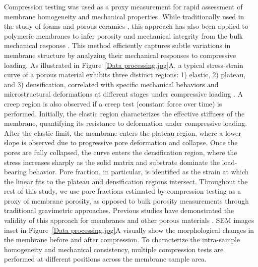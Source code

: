 \documentclass[preprint,12pt,times]{elsarticle}
\begin{document}
Compression testing was used as a proxy measurement for rapid assessment of membrane homogeneity and mechanical properties. While traditionally used in the study of foams and porous ceramics \cite{Thiyagarajan2022, Chen2017}, this approach has also been applied to polymeric membranes to infer porosity and mechanical integrity from the bulk mechanical response \cite{AGHAJANI2017293, Aghajani2018, Gibson_2003}. This method efficiently captures subtle variations in membrane structure by analyzing their mechanical responses to compressive loading. As illustrated in Figure~\ref{Data processing.jpg}A, a typical stress-strain curve of a porous material exhibits three distinct regions: 1) elastic, 2) plateau, and 3) densification, correlated with specific mechanical behaviors and microstructural deformations at different stages under compressive loading \cite{Costa2008, Thiyagarajan2022, AGHAJANI2017293, Gibson_2003}. A creep region is also observed if a creep test (constant force over time) is performed. Initially, the elastic region characterizes the effective stiffness of the membrane, quantifying its resistance to deformation under compressive loading. After the elastic limit, the membrane enters the plateau region, where a lower slope is observed due to progressive pore deformation and collapse. Once the pores are fully collapsed, the curve enters the densification region, where the stress increases sharply as the solid matrix and substrate dominate the load-bearing behavior. Pore fraction, in particular, is identified as the strain at which the linear fits to the plateau and densification regions intersect. Throughout the rest of this study, we use pore fractions estimated by compression testing as a proxy of membrane porosity, as opposed to bulk porosity measurements through traditional gravimetric approaches. Previous studies have demonstrated the validity of this approach for membranes and other porous materials \cite{Aghajani2018, Miralbes2023, Xu2024}. SEM images inset in Figure~\ref{Data processing.jpg}A visually show the morphological changes in the membrane before and after compression. To characterize the intra-sample homogeneity and mechanical consistency, multiple compression tests are performed at different positions across the membrane sample area.
\end{document}
